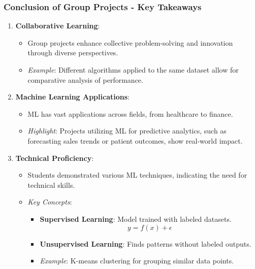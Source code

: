 \documentclass[aspectratio=169]{beamer}
\begin{document}
\begin{frame}[fragile]
  \frametitle{Conclusion of Group Projects - Key Takeaways}
  \begin{enumerate}
    \item \textbf{Collaborative Learning}:
      \begin{itemize}
        \item Group projects enhance collective problem-solving and innovation through diverse perspectives.
        \item \textit{Example}: Different algorithms applied to the same dataset allow for comparative analysis of performance.
      \end{itemize}
      
    \item \textbf{Machine Learning Applications}:
      \begin{itemize}
        \item ML has vast applications across fields, from healthcare to finance.
        \item \textit{Highlight}: Projects utilizing ML for predictive analytics, such as forecasting sales trends or patient outcomes, show real-world impact.
      \end{itemize}
      
    \item \textbf{Technical Proficiency}:
      \begin{itemize}
        \item Students demonstrated various ML techniques, indicating the need for technical skills.
        \item \textit{Key Concepts}:
          \begin{itemize}
            \item \textbf{Supervised Learning}: Model trained with labeled datasets. 
              \begin{equation}
                y = f(x) + \epsilon
              \end{equation}
            \item \textbf{Unsupervised Learning}: Finds patterns without labeled outputs.
              \item \textit{Example}: K-means clustering for grouping similar data points.
          \end{itemize}
        \end{itemize}
  \end{enumerate}
\end{frame}
\end{document}
